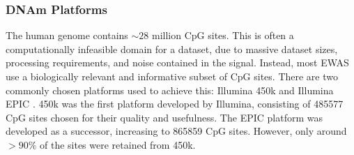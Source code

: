 \documentclass{article}
\begin{document}
\subsubsection{DNAm Platforms}
The human genome contains \(\sim\!28\) million CpG sites. This is often a computationally infeasible domain for a dataset, due to massive dataset sizes, processing requirements, and noise contained in the signal. Instead, most EWAS use a biologically relevant and informative subset of CpG sites. There are two commonly chosen platforms used to achieve this: Illumina 450k \cite{illumina2012methylation450} and Illumina EPIC \cite{illumina2015methylationepic}. 450k was the first platform developed by Illumina, consisting of \num{485577} CpG sites chosen for their quality and usefulness. The EPIC platform was developed as a successor, increasing to \num{865859} CpG sites. However, only around \(>90\%\) of the sites were retained from 450k.


\end{document}
